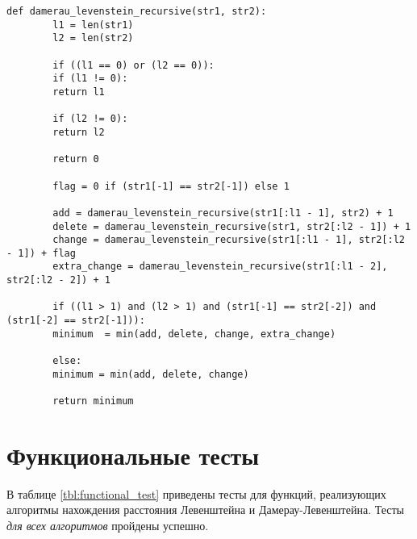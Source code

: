 \begin{center}
	\captionsetup{justification=raggedright,singlelinecheck=off}
	\begin{lstlisting}[label=lst:dam_lev_rec,caption=Алгоритм нахождения расстояния Дамерау-Левенштейна (рекурсивный)]
		def damerau_levenstein_recursive(str1, str2):
		l1 = len(str1)
		l2 = len(str2)
		
		if ((l1 == 0) or (l2 == 0)):
		if (l1 != 0):
		return l1
		
		if (l2 != 0):
		return l2
		
		return 0
		
		flag = 0 if (str1[-1] == str2[-1]) else 1
		
		add = damerau_levenstein_recursive(str1[:l1 - 1], str2) + 1
		delete = damerau_levenstein_recursive(str1, str2[:l2 - 1]) + 1
		change = damerau_levenstein_recursive(str1[:l1 - 1], str2[:l2 - 1]) + flag
		extra_change = damerau_levenstein_recursive(str1[:l1 - 2], str2[:l2 - 2]) + 1
		
		if ((l1 > 1) and (l2 > 1) and (str1[-1] == str2[-2]) and (str1[-2] == str2[-1])):
		minimum  = min(add, delete, change, extra_change)
		
		else:
		minimum = min(add, delete, change)
		
		return minimum
	\end{lstlisting}
\end{center}

\section{Функциональные тесты}

В таблице \ref{tbl:functional_test} приведены тесты для функций, реализующих алгоритмы нахождения расстояния Левенштейна и Дамерау-Левенштейна. Тесты \textit{для всех алгоритмов} пройдены успешно.

